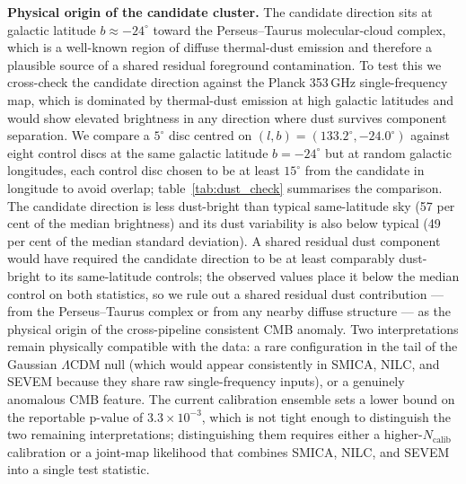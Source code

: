 \documentclass[a4paper,11pt]{article}
\begin{document}
\textbf{Physical origin of the candidate cluster.} The candidate direction sits at galactic latitude $b \approx -24^\circ$ toward the Perseus--Taurus molecular-cloud complex, which is a well-known region of diffuse thermal-dust emission and therefore a plausible source of a shared residual foreground contamination. To test this we cross-check the candidate direction against the Planck 353\,GHz single-frequency map, which is dominated by thermal-dust emission at high galactic latitudes and would show elevated brightness in any direction where dust survives component separation. We compare a $5^\circ$ disc centred on $(l, b) = (133.2^\circ, -24.0^\circ)$ against eight control discs at the same galactic latitude $b = -24^\circ$ but at random galactic longitudes, each control disc chosen to be at least $15^\circ$ from the candidate in longitude to avoid overlap; table~\ref{tab:dust_check} summarises the comparison. The candidate direction is less dust-bright than typical same-latitude sky (57 per cent of the median brightness) and its dust variability is also below typical (49 per cent of the median standard deviation). A shared residual dust component would have required the candidate direction to be at least comparably dust-bright to its same-latitude controls; the observed values place it below the median control on both statistics, so we rule out a shared residual dust contribution --- from the Perseus--Taurus complex or from any nearby diffuse structure --- as the physical origin of the cross-pipeline consistent CMB anomaly. Two interpretations remain physically compatible with the data: a rare configuration in the tail of the Gaussian $\Lambda$CDM null (which would appear consistently in SMICA, NILC, and SEVEM because they share raw single-frequency inputs), or a genuinely anomalous CMB feature. The current calibration ensemble sets a lower bound on the reportable p-value of $3.3 \times 10^{-3}$, which is not tight enough to distinguish the two remaining interpretations; distinguishing them requires either a higher-$N_{\text{calib}}$ calibration or a joint-map likelihood that combines SMICA, NILC, and SEVEM into a single test statistic.
\end{document}
